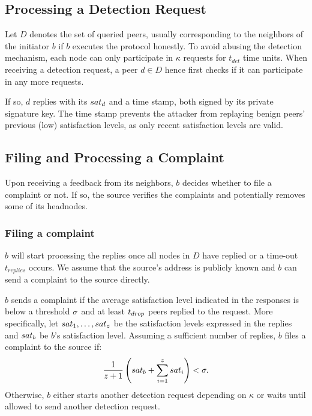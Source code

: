 \subsection{Processing a Detection Request}
Let $D$ denotes the set of queried peers, usually corresponding to the neighbors of the initiator $b$ if $b$ executes the protocol honestly.  
To avoid abusing the detection mechanism, each node can only participate in $\kappa$ requests for $t_{det}$ time units. 
When receiving a detection request, a peer $d \in D$ hence first checks if it can participate in any more requests. 
    
If so, $d$ replies with its $sat_d$ and a time stamp, both signed by its private signature key. 
The time stamp prevents the attacker from replaying benign peers' previous (low) satisfaction levels, as only recent satisfaction levels are valid.


\subsection{Filing and Processing a Complaint}

Upon receiving a feedback from its neighbors, $b$ decides whether to file a complaint or not.
If so, the source verifies the complaints and potentially removes some of its headnodes. 

\subsubsection*{Filing a complaint}
$b$ will start processing the replies once all nodes in $D$ have replied or a time-out $t_{replies}$ occurs. 
We assume that the source's address is publicly known and $b$ can send a complaint to the source directly.

$b$ sends a complaint if the average satisfaction level indicated in the responses is below a threshold $\sigma$ and at least $t_{drop}$ peers replied to the request. 
More specifically, let $sat_1, \ldots ,sat_z$ be the satisfaction levels expressed in the replies and $sat_b$ be $b$'s satisfaction level. 
Assuming a sufficient number of replies, $b$ files a complaint to the source if:
\begin{align}
\label{eq:drop_satis_equation}
\frac{1}{z+1}\left( \sat_b + \sum_{i=1}^{z} \sat_i \right) < \satThres. 
\end{align} 
Otherwise, $b$ either starts another detection request depending on $\kappa$ or waits until allowed to send another detection request.
 

